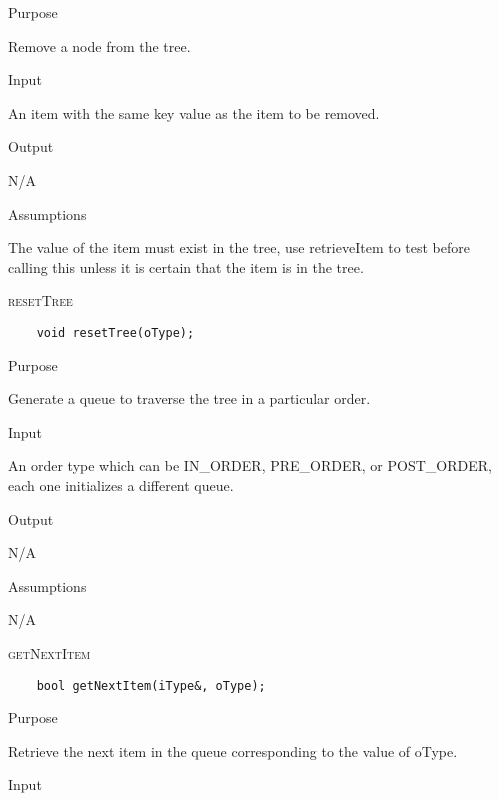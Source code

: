 \documentclass[pdftex, 12pt]{article}
\begin{document}
\begin{description}
\begin{description}
			\item{Purpose}

				Remove a node from the tree.

			\item{Input}

				An item with the same key value as the item to be removed.

			\item{Output}

				N/A

			\item{Assumptions}

				The value of the item must exist in the tree, use retrieveItem to test before calling this unless it is
				certain that the item is in the tree.

		\end{description}
	\item{\textsc{resetTree}}
\begin{lstlisting}
	void resetTree(oType);
\end{lstlisting}
		\begin{description}

			\item{Purpose}

				Generate a queue to traverse the tree in a particular order.

			\item{Input}

				An order type which can be IN\_ORDER, PRE\_ORDER, or POST\_ORDER, each one initializes a different
				queue.

			\item{Output}

				N/A

			\item{Assumptions}

				N/A

		\end{description}
	\item{\textsc{getNextItem}}
\begin{lstlisting}
	bool getNextItem(iType&, oType);
\end{lstlisting}
		\begin{description}

			\item{Purpose}

				Retrieve the next item in the queue corresponding to the value of oType.

			\item{Input}


\end{description}
\end{description}
\end{document}
